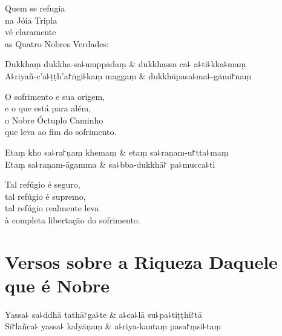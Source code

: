 \begin{english}
  Quem se refugia\\
  na Jóia Tripla\\
  vê claramente\\
  as Quatro Nobres Verdades:
\end{english}

\begin{twochants}
  Dukkhaṃ dukkha-sa꜕muppādaṃ & dukkhassa ca꜕ a꜕ti꜕kka꜕maṃ \\
  A꜕riyañ-c'a꜕ṭṭh'a꜓ṅgi꜕kaṃ maggaṃ & dukkhūpasa꜕ma꜕-gāmi꜓naṃ \\
\end{twochants}

\begin{english}
  O sofrimento e sua origem,\\
  e o que está para além,\\
  o Nobre Óctuplo Caminho\\
  que leva ao fim do sofrimento.
\end{english}

\begin{twochants}
  Etaṃ kho sa꜕ra꜓ṇaṃ khemaṃ & etaṃ sa꜕raṇam-u꜓tta꜕maṃ \\
  Etaṃ sa꜕raṇam-āgamma & sa꜕bba-dukkhā꜓ pa꜕mucca꜕ti \\
\end{twochants}

\begin{english}
  Tal refúgio é seguro,\\
  tal refúgio é supremo,\\
  tal refúgio realmente leva\\
  à completa libertação do sofrimento.
\end{english}

\chapter{Versos sobre a Riqueza Daquele que é Nobre}


\begin{leader}
\end{leader}

\begin{twochants}
  Yassa꜕ sa꜕ddhā tathā꜓ga꜕te & a꜕ca꜕lā su꜕pa꜕tiṭṭhi꜓tā \\
  Sī꜓lañca꜕ yassa꜕ kalyāṇaṃ & a꜕riya-kantaṃ pasa꜓ṃsi꜕taṃ \\
\end{twochants}

